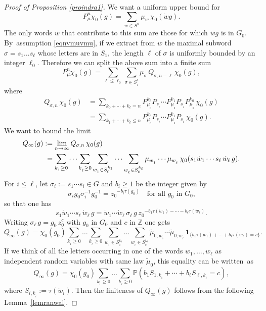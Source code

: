 \documentclass[11pt]{article}
\numberwithin{equation}{section}
\theoremstyle{definition}
\newcommand{\m}[1]{\mathbb{ #1}}
\let\si\sigma
\let\ra\to
\begin{document}
\begin{proof}[Proof of Proposition \ref{proindra1}]
We want a uniform upper bound for
\[
P^n_\mu\chi_0(g)
=
\sum_{w\in S^n}\mu_w\,\chi_0(\dot{w}g).
\]
The only words $w$ that contribute to this sum are those for which
$\dot{w}g$ is in $G_0$.
By~assumption \eqref{eqnvmuvmu},
if we extract from $w$ the maximal subword $\si=s_1\ldots s_\ell$
whose letters are in $S_1$, the length $\ell$ of $\si$ is uniformly bounded
by an integer $\ell_0$.
Therefore we can split the above sum into a finite sum
\[
P^n_\mu\chi_0(g)
=
\sum_{\ell\leq \ell_0}\sum_{\si\in S_{_1}^\ell}
\mu_\si\,Q_{\si,n-\ell}\,\chi_0(g),
\]
where
\begin{equation}
\label{eqnqsinch}
\begin{aligned}
Q_{\si,n}\,\chi_0(g)
&=
\sum_{k_0+\cdots +k_\ell=n}
P^{k_\ell}_{\mu_{_0}}P_{s_{_\ell}}\cdots
P^{k_1}_{\mu_{_0}}P_{s_{_1}}P^{k_0}_{\mu_{_0}}\,\chi_0(g)\\
&=
\sum_{k_1+\cdots +k_\ell\leq n}
P^{k_\ell}_{\mu_{_0}}P_{s_{_\ell}}\cdots
P^{k_1}_{\mu_{_0}}P_{s_{_1}}\,\chi_0(g).
\end{aligned}
\end{equation}
We want to bound the limit
\begin{equation}
\label{eqnqsiinf}
\begin{aligned}
Q_\infty(g)
&:=
\lim_{n\ra\infty}
Q_{\si,n}\,\chi_0(g)\\
&\hphantom{:}=
\sum_{k_{_1}\geq 0}\cdots\sum_{k_{_\ell}\geq 0}
\sum_{w_{_1}\in S^{k_1}_{_0}}\cdots\sum_{w_{_\ell}\in S^{k_\ell}_{_0}}
\mu_{w_{_1}}\cdots\mu_{w_{_\ell}}\,\chi_0(s_1\dot{w}_{1}\cdots s_\ell\, \dot{w}_{\ell}\, g).
\end{aligned}
\end{equation}
For $i\leq \ell$, let $\si_i:=s_1\cdots s_i\in G$ and $b_i\geq 1$ be the integer given by
\[
\si_ig_0\si_i^{-1}g_0^{-1}={z_0}^{-b_i\tau(g_0)}
\quad\text{for all $g_0$ in $G_0$,}
\]
so that one has
\begin{equation}
\label{eqnswswg}
s_1\dot{w}_{1}\cdots s_\ell\, \dot{w}_{\ell}\, g
=
\dot{w}_{1}\cdots \dot{w}_{\ell}\,\si_\ell\, g\, {z_0}^{-b_1\tau(\dot{w}_1)-\cdots -b_\ell\tau(\dot{w}_\ell)}.
\end{equation}
Writing $\si_\ell\, g=g_0\,z_0^{c}$ with $g_0$ in $G_0$ and $c$ in $\m Z$
one gets
\[
Q_\infty(g)
=\chi_0(g_0)\sum_{k_{_1}\geq 0}\ldots\sum_{k_{_\ell}\geq 0}
\sum_{w_{_1}\in S^{k_1}_{_0}}\ldots\sum_{w_{_\ell}\in S^{k_\ell}_{_0}}
\widetilde{\mu}_{0,w_{_1}}\cdots\widetilde{\mu}_{0,w_{_\ell}}\,
\mathbf{1}_{\{b_1\tau(\dot{w}_1)+\cdots +b_\ell\tau(\dot{w}_\ell)=c\}}.
\]
If we think of all the letters occurring in one of the words $w_1,\ldots, w_\ell$
as independent random variables with same law $\widetilde{\mu}_0$,
this equality can be written~as
\[
\label{eqnqinf3}
Q_\infty(g)
=\chi_0(g_0)
\sum_{k_{_1}\geq 0}\ldots\sum_{k_{_\ell}\geq 0}
\m P(b_1S_{1,k_{_1}}+\cdots +b_\ell S_{\ell,k_{_\ell}}=c),
\]
where $S_{i,k_{_i}}:=\tau(\dot{w}_i)$.
Then the finiteness of $Q_\infty(g)$ follows from the following
Lemma~\ref{lemranwal}.
\end{proof}
\end{document}
